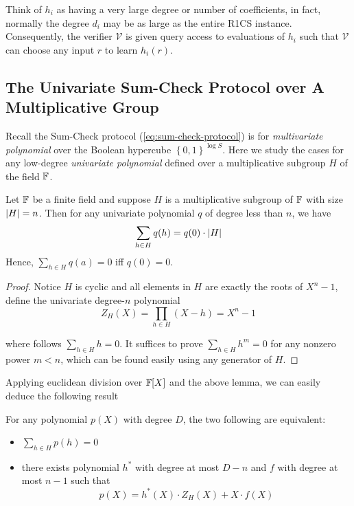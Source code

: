 \documentclass{article}
\begin{document}
Think of $h_i$ as having a very large degree or number of coefficients, in fact, normally the degree $d_i$ may be as large as the entire R1CS instance. Consequently, the verifier $\mathcal{V}$ is given query access to evaluations of $h_i$ such that $\mathcal{V}$ can choose any input $r$ to learn $h_i(r)$. 

\subsection{The Univariate Sum-Check Protocol over A Multiplicative Group}

Recall the Sum-Check protocol (\ref{eq:sum-check-protocol}) is for \textit{multivariate polynomial} over the Boolean hypercube $\left\{ 0, 1 \right\}^{\log S}$. Here we study the cases for any low-degree \textit{univariate polynomial} defined over a multiplicative subgroup $H$ of the field $\mathbb{F}$. 

\begin{lemma}
Let $\mathbb{F}$ be a finite field and suppose $H$ is a multiplicative subgroup of $\mathbb{F}$ with size $\abs{H} = n$. Then for any univariate polynomial $q$ of degree less than $n$, we have
\begin{equation*}
\sum_{h \in H} q(h) = q(0) \cdot \abs{H}
\end{equation*}
Hence, $\sum \limits_{h \in H} q(a) = 0$ iff $q(0) = 0$.
\end{lemma}

\begin{proof}
Notice $H$ is cyclic and all elements in $H$ are exactly the roots of $X^{n} - 1$, define the univariate degree-$n$ polynomial
\begin{equation*}
Z_H(X) = \prod_{h \in H} (X - h) = X^n - 1
\end{equation*}

where follows $\sum \limits_{h \in H} h = 0$. It suffices to prove $\sum \limits_{h \in H} h^m = 0$ for any nonzero power $m < n$, which can be found easily using any generator of $H$.
\end{proof}

Applying euclidean division over $\mathbb{F}[X]$ and the above lemma, we can easily deduce the following result 

\begin{lemma}
For any polynomial $p(X)$ with degree $D$, the two following are equivalent: 
\begin{itemize}
\item $\sum \limits_{h \in H} p(h) = 0$ 
\item there exists polynomial $h^{\displaystyle *}$ with degree at most $D-n$ and $f$ with degree at most $n-1$ such that 
\begin{equation*}
p(X) = h^{\displaystyle *}(X) \cdot Z_H(X) + X \cdot f(X)
\end{equation*}
\end{itemize}
\end{lemma}
\end{document}
